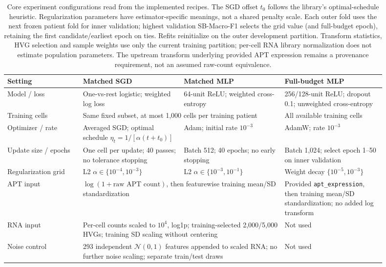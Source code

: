 \begin{table}[!htbp]
\centering\small
\setlength{\tabcolsep}{4pt}
\renewcommand{\arraystretch}{1.13}
\begin{tabular}{p{0.18\linewidth}p{0.24\linewidth}p{0.24\linewidth}p{0.24\linewidth}}
\toprule
Setting & Matched SGD & Matched MLP & Full-budget MLP \\
\midrule
Model / loss & One-vs-rest logistic; weighted log loss & 64-unit ReLU; weighted cross-entropy & 256/128-unit ReLU; dropout 0.1; unweighted cross-entropy \\
Training cells & \multicolumn{2}{p{0.49\linewidth}}{Same fixed subset, at most 1,000 cells per training patient} & All available training cells \\
Optimizer / rate & Averaged SGD; optimal schedule $\eta_t=1/[\alpha(t+t_0)]$ & Adam; initial rate $10^{-3}$ & AdamW; rate $10^{-3}$ \\
Update size / epochs & One cell per update; 40 passes; no tolerance stopping & Batch 512; 40 epochs; no early stopping & Batch 1,024; select epoch 1--50 on inner validation \\
Regularization grid & L2 $\alpha\in\{10^{-4},10^{-3}\}$ & L2 $\alpha\in\{10^{-3},10^{-1}\}$ & Weight decay $\{10^{-5},10^{-3}\}$ \\
APT input & \multicolumn{2}{p{0.49\linewidth}}{$\log(1+\text{raw APT count})$, then featurewise training mean/SD standardization} & Provided \texttt{apt\_expression}, then training mean/SD standardization; no added log transform \\
RNA input & \multicolumn{2}{p{0.49\linewidth}}{Per-cell counts scaled to $10^4$, log1p; training-selected 2,000/5,000 HVGs; training SD scaling without centering} & Not used \\
Noise control & \multicolumn{2}{p{0.49\linewidth}}{293 independent $\mathcal N(0,1)$ features appended to scaled RNA; no further noise scaling; separate train/test draws} & Not used \\
\bottomrule
\end{tabular}
\caption{Core experiment configurations read from the implemented recipes.
The SGD offset $t_0$ follows the library's optimal-schedule heuristic.
Regularization parameters have estimator-specific meanings, not a shared
penalty scale. Each outer fold uses the next frozen patient fold for inner
validation; highest validation SB-Macro-F1 selects the grid value (and
full-budget epoch), retaining the first candidate/earliest epoch on ties.
Refits reinitialize on the outer development partition. Transform statistics,
HVG selection and sample weights use only the current training partition;
per-cell RNA library normalization does not estimate population parameters.
The upstream transform underlying provided APT expression remains a
provenance requirement, not an assumed raw-count equivalence.}
\label{tab:identity_training_config}
\end{table}
